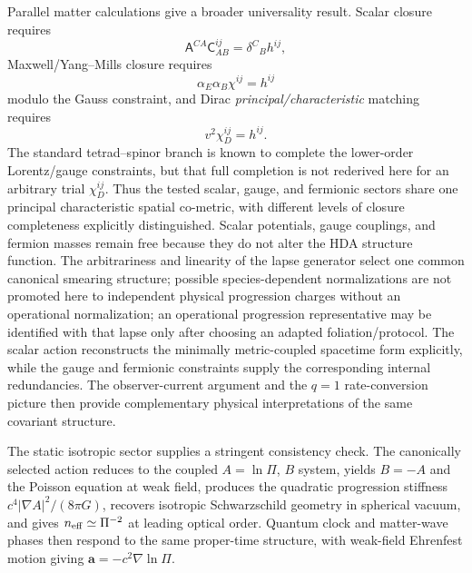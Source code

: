 \documentclass[11pt]{article}
\begin{document}
Parallel matter calculations give a broader universality result. Scalar closure requires
\begin{equation}
    \mathsf A^{CA}\mathsf C^{ij}_{AB}=\delta^C{}_B h^{ij},
\end{equation}
Maxwell/Yang--Mills closure requires
\begin{equation}
    \alpha_E\alpha_B\chi^{ij}=h^{ij}
\end{equation}
modulo the Gauss constraint, and Dirac \emph{principal/characteristic} matching requires
\begin{equation}
    v^2\chi_D^{ij}=h^{ij}.
\end{equation}
The standard tetrad--spinor branch is known to complete the lower-order Lorentz/gauge constraints, but that full completion is not rederived here for an arbitrary trial $\chi_D^{ij}$. Thus the tested scalar, gauge, and fermionic sectors share one principal characteristic spatial co-metric, with different levels of closure completeness explicitly distinguished. Scalar potentials, gauge couplings, and fermion masses remain free because they do not alter the HDA structure function. The arbitrariness and linearity of the lapse generator select one common canonical smearing structure; possible species-dependent normalizations are not promoted here to independent physical progression charges without an operational normalization; an operational progression representative may be identified with that lapse only after choosing an adapted foliation/protocol. The scalar action reconstructs the minimally metric-coupled spacetime form explicitly, while the gauge and fermionic constraints supply the corresponding internal redundancies. The observer-current argument and the $q=1$ rate-conversion picture then provide complementary physical interpretations of the same covariant structure.

The static isotropic sector supplies a stringent consistency check. The canonically selected action reduces to the coupled $A=\ln\Pi$, $B$ system, yields $B=-A$ and the Poisson equation at weak field, produces the quadratic progression stiffness $c^4|\nabla A|^2/(8\pi G)$, recovers isotropic Schwarzschild geometry in spherical vacuum, and gives $n_{\rm eff}\simeq\Pi^{-2}$ at leading optical order. Quantum clock and matter-wave phases then respond to the same proper-time structure, with weak-field Ehrenfest motion giving $\mathbf a=-c^2\nabla\ln\Pi$.
\end{document}
